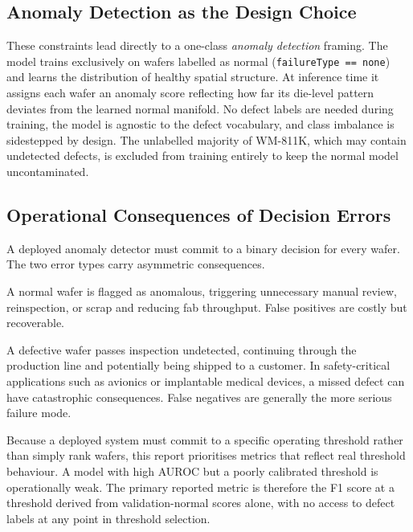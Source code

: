 \documentclass[11pt]{article}
\begin{document}
\subsection{Anomaly Detection as the Design Choice}

These constraints lead directly to a one-class \emph{anomaly detection}
framing. The model trains exclusively on wafers labelled as normal
(\texttt{failureType\,==\,none}) and learns the distribution of healthy
spatial structure. At inference time it assigns each wafer an anomaly score
reflecting how far its die-level pattern deviates from the learned normal
manifold. No defect labels are needed during training, the model is agnostic
to the defect vocabulary, and class imbalance is sidestepped by design.
The unlabelled majority of WM-811K, which may contain undetected defects,
is excluded from training entirely to keep the normal model uncontaminated.

\subsection{Operational Consequences of Decision Errors}

A deployed anomaly detector must commit to a binary decision for every wafer.
The two error types carry asymmetric consequences.

\begin{description}[leftmargin=2em, style=nextline]
  \item[False positive] A normal wafer is flagged as anomalous, triggering
        unnecessary manual review, reinspection, or scrap and reducing fab
        throughput. False positives are costly but recoverable.
  \item[False negative] A defective wafer passes inspection undetected,
        continuing through the production line and potentially being shipped
        to a customer. In safety-critical applications such as avionics or
        implantable medical devices, a missed defect can have catastrophic
        consequences. False negatives are generally the more serious failure mode.
\end{description}

Because a deployed system must commit to a specific operating threshold rather
than simply rank wafers, this report prioritises metrics that reflect real
threshold behaviour. A model with high AUROC but a poorly calibrated threshold
is operationally weak. The primary reported metric is therefore the F1 score
at a threshold derived from validation-normal scores alone, with no access to
defect labels at any point in threshold selection.
\end{document}
